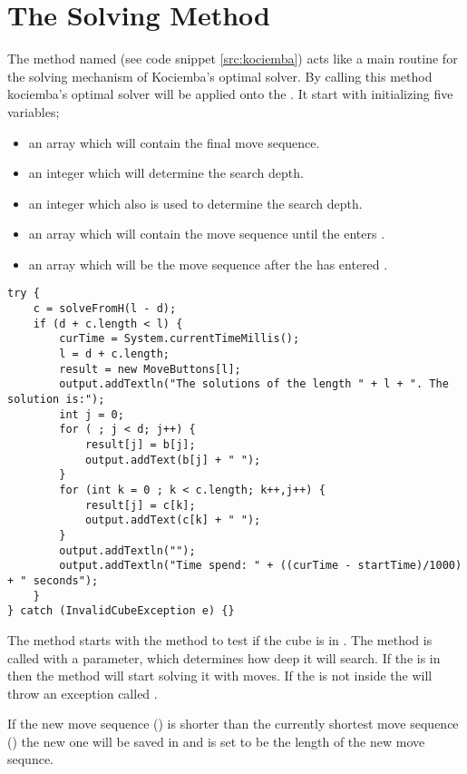 \section{The Solving Method}
\label{sec:kSolve}
The method named  (see code snippet \ref{src:kociemba}) acts like a main routine for the solving mechanism of Kociemba's optimal solver. By calling this method kociemba's optimal solver will be applied onto the \rubik{}. 
It start with initializing five variables; 
\begin{itemize}
\item an array  which will contain the final move sequence.
\item an integer  which will determine the search depth. 
\item an integer  which also is used to determine the search depth.
\item an array  which will contain the move sequence until the \rubik{} enters .
\item an array  which will be the move sequence after the \rubik{} has entered .
\end{itemize}


\begin{lstlisting}[style=sourceCode, caption=\myCaption{Key point in the solve method of kociemba's optimal solver}, label=src:kociemba]
try {
	c = solveFromH(l - d);
	if (d + c.length < l) {
		curTime = System.currentTimeMillis();
		l = d + c.length;
		result = new MoveButtons[l];
		output.addTextln("The solutions of the length " + l + ". The solution is:");
		int j = 0;
		for ( ; j < d; j++) {
			result[j] = b[j];
			output.addText(b[j] + " ");
		}
		for (int k = 0 ; k < c.length; k++,j++) {
			result[j] = c[k];
			output.addText(c[k] + " ");
		}
		output.addTextln("");
		output.addTextln("Time spend: " + ((curTime - startTime)/1000) + " seconds");
	}
} catch (InvalidCubeException e) {}
\end{lstlisting}

The  method starts with the  method to test if the cube is in . The method  is called with a parameter, which determines how deep it will search. If the \rubik{} is in  then the method will start solving it with  moves. If the \rubik{} is not inside  the  will throw an exception called . 

If the new move sequence () is shorter than the currently shortest move sequence () the new one will be saved in  and  is set to be the length of the new move sequnce.

